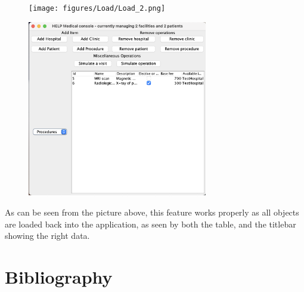 \documentclass{article}
\begin{document}
\begin{figure}[ht]
  \begin{center}
    \texttt{[image: figures/Load/Load\_2.png]}
  \end{center}
\end{figure}

\begin{figure}[ht]
  \begin{center}
    \includegraphics[width=0.7\textwidth]{figures/Load/Load_3.png}
  \end{center}
\end{figure}

As can be seen from the picture above, this feature works properly as all objects are loaded back into the application, as seen by both the table, and the titlebar showing the right data.

\section{Bibliography}\label{sec:bibliography} %
\printbibliography

\end{document}
